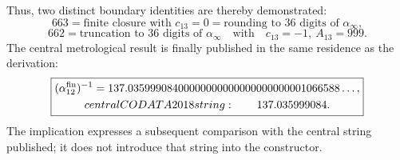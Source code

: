 Thus, two distinct boundary identities are thereby demonstrated:
\[
 \boxed{
 663=\text{finite closure with }c_{13}=0
     =\text{rounding to 36 digits of }\alpha_\infty,}
\]
\[
 \boxed{
 662=\text{truncation to 36 digits of }\alpha_\infty
 \quad\text{with}\quad c_{13}=-1,\ A_{13}=999.}
\]
The central metrological result is finally published in the same residence as the derivation:
\begin{equation}
 \boxed{
 \begin{gathered}
  (\alpha_{12}^{\rm fin})^{-1}
  =137.03599908400000000000000000000001066588\ldots,\\
  \text{central CODATA 2018 string:}\qquad137.035999084.
 \end{gathered}}
 \label{p12-83-c10-s2:eq:resultado-final-alpha-codata-2018}
\end{equation}
The implication expresses a subsequent comparison with the central string published; it does not introduce that string into the constructor.
